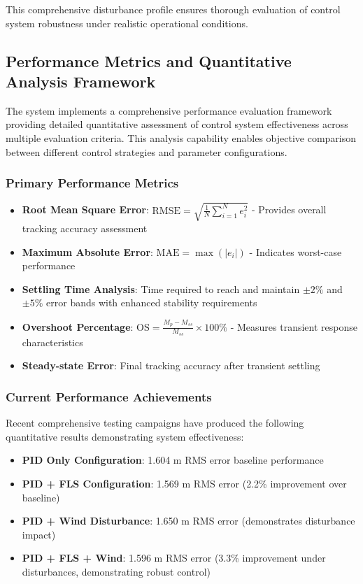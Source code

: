 This comprehensive disturbance profile ensures thorough evaluation of control system robustness under realistic operational conditions.

\subsection*{Performance Metrics and Quantitative Analysis Framework}

The system implements a comprehensive performance evaluation framework providing detailed quantitative assessment of control system effectiveness across multiple evaluation criteria. This analysis capability enables objective comparison between different control strategies and parameter configurations.

\subsubsection*{Primary Performance Metrics}

\begin{itemize}
    \item \textbf{Root Mean Square Error}: $\text{RMSE} = \sqrt{\frac{1}{N}\sum_{i=1}^{N} e_i^2}$ - Provides overall tracking accuracy assessment
    \item \textbf{Maximum Absolute Error}: $\text{MAE} = \max(|e_i|)$ - Indicates worst-case performance
    \item \textbf{Settling Time Analysis}: Time required to reach and maintain $\pm 2\%$ and $\pm 5\%$ error bands with enhanced stability requirements
    \item \textbf{Overshoot Percentage}: $\text{OS} = \frac{M_p - M_{ss}}{M_{ss}} \times 100\%$ - Measures transient response characteristics
    \item \textbf{Steady-state Error}: Final tracking accuracy after transient settling
\end{itemize}

\subsubsection*{Current Performance Achievements}

Recent comprehensive testing campaigns have produced the following quantitative results demonstrating system effectiveness:

\begin{itemize}
    \item \textbf{PID Only Configuration}: 1.604 m RMS error baseline performance
    \item \textbf{PID + FLS Configuration}: 1.569 m RMS error (2.2\% improvement over baseline)
    \item \textbf{PID + Wind Disturbance}: 1.650 m RMS error (demonstrates disturbance impact)
    \item \textbf{PID + FLS + Wind}: 1.596 m RMS error (3.3\% improvement under disturbances, demonstrating robust control)
\end{itemize}

